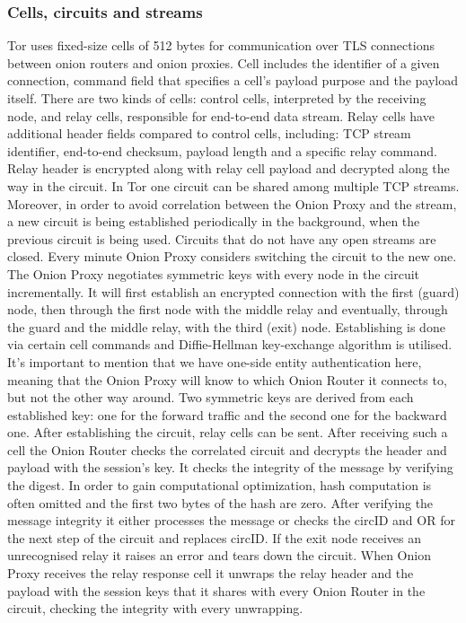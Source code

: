 \subsubsection{Cells, circuits and streams}
Tor uses fixed-size cells of 512 bytes for communication over TLS connections between onion routers and onion proxies. Cell includes the identifier of a given connection, command field that specifies a cell’s payload purpose and the payload itself. There are two kinds of cells: control cells, interpreted by the receiving node, and relay cells, responsible for end-to-end data stream. Relay cells have additional header fields compared to control cells, including: TCP stream identifier, end-to-end checksum, payload length and a specific relay command. Relay header is encrypted along with relay cell payload and decrypted along the way in the circuit.
In Tor one circuit can be shared among multiple TCP streams. Moreover, in order to avoid correlation between the Onion Proxy and the stream, a new circuit is being established periodically in the background, when the previous circuit is being used. Circuits that do not have any open streams are closed. Every minute Onion Proxy considers switching the circuit to the new one.
The Onion Proxy negotiates symmetric keys with every node in the circuit incrementally. It will first establish an encrypted connection with the first (guard) node, then through the first node with the middle relay and eventually, through the guard and the middle relay, with the third (exit) node. Establishing is done via certain cell commands and Diffie-Hellman key-exchange algorithm is utilised. It’s important to mention that we have one-side entity authentication here, meaning that the Onion Proxy will know to which Onion Router it connects to, but not the other way around. Two symmetric keys are derived from each established key: one for the forward traffic and the second one for the backward one.
After establishing the circuit, relay cells can be sent. After receiving such a cell the Onion Router checks the correlated circuit and decrypts the header and payload with the session’s key. It checks the integrity of the message by verifying the digest. In order to gain computational optimization, hash computation is often omitted and the first two bytes of the hash are zero. After verifying the message integrity it either processes the message or checks the circID and OR for the next step of the circuit and replaces circID. If the exit node receives an unrecognised relay it raises an error and tears down the circuit. When Onion Proxy receives the relay response cell it unwraps the relay header and the payload with the session keys that it shares with every Onion Router in the circuit, checking the integrity with every unwrapping. 
